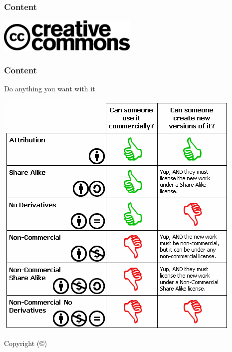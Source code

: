 \documentclass{beamer}
\begin{document}
\begin{frame}
  \frametitle{Content}
  \begin{center}
    \includegraphics[width=0.5\textwidth]{../img/cc}
  \end{center}
\end{frame}

\begin{frame}
  \frametitle{Content}
  \begin{center}
    \begin{large}Do anything you want with it \end{large}

    \includegraphics[height=0.7\textheight]{../img/cc-list}

    \begin{large}Copyright (\copyright) \end{large}
  \end{center}
\end{frame}
\end{document}
